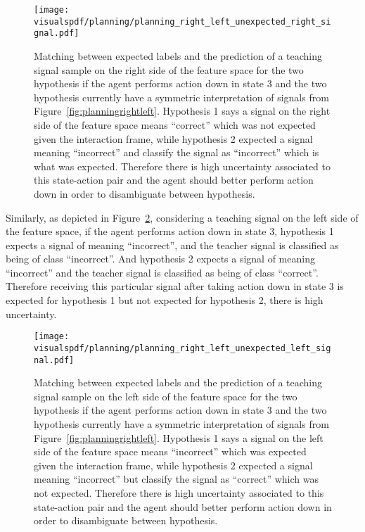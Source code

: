 \begin{figure}[!ht]
  \centering
  \texttt{[image: \\visualspdf/planning/planning\_right\_left\_unexpected\_right\_signal.pdf]}
  \caption{Matching between expected labels and the prediction of a teaching signal sample on the right side of the feature space for the two hypothesis if the agent performs action down in state 3 and the two hypothesis currently have a symmetric interpretation of signals from Figure~\ref{fig:planningrightleft}. Hypothesis 1 says a signal on the right side of the feature space means ``correct'' which was not expected given the interaction frame, while hypothesis 2 expected a signal meaning ``incorrect'' and classify the signal as ``incorrect'' which is what was expected. Therefore there is high uncertainty associated to this state-action pair and the agent should better perform action down in order to disambiguate between hypothesis.}
  \label{fig:uncertaintymeaningrightleftunexpectedright}
\end{figure}

Similarly, as depicted in Figure~\ref{fig:uncertaintymeaningrightleftunexpectedleft}, considering a teaching signal on the left side of the feature space, if the agent performs action down in state 3, hypothesis 1 expects a signal of meaning ``incorrect'', and the teacher signal is classified as being of class ``incorrect''. And hypothesis 2 expects a signal of meaning ``incorrect'' and the teacher signal is classified as being of class ``correct''. Therefore receiving this particular signal after taking action down in state 3 is expected for hypothesis 1 but not expected for hypothesis 2, there is high uncertainty.

\begin{figure}[!ht]
  \centering
  \texttt{[image: \\visualspdf/planning/planning\_right\_left\_unexpected\_left\_signal.pdf]}
  \caption{Matching between expected labels and the prediction of a teaching signal sample on the left side of the feature space for the two hypothesis if the agent performs action down in state 3 and the two hypothesis currently have a symmetric interpretation of signals from Figure~\ref{fig:planningrightleft}. Hypothesis 1 says a signal on the left side of the feature space means ``incorrect'' which was expected given the interaction frame, while hypothesis 2 expected a signal meaning ``incorrect'' but classify the signal as ``correct'' which was not expected. Therefore there is high uncertainty associated to this state-action pair and the agent should better perform action down in order to disambiguate between hypothesis.}
  \label{fig:uncertaintymeaningrightleftunexpectedleft}
\end{figure}

